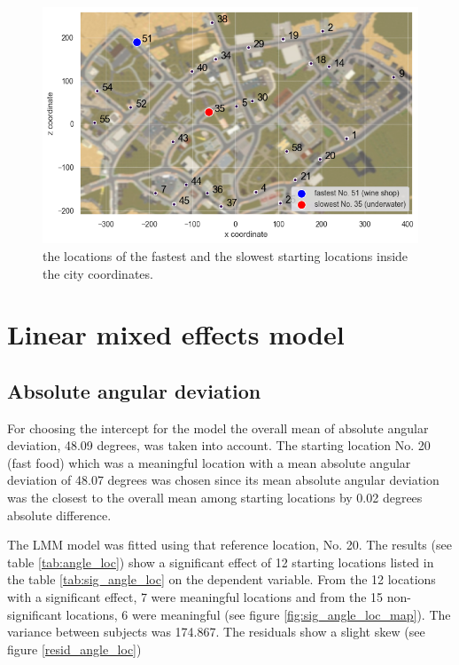 \begin{figure}[!htb]
	\centering
	\includegraphics[width=140mm]{figures/fastest_slowest_starting_locations_RT_map.png}
	\caption[Locations of fastest and slowest starting locations in city]{the locations of the fastest and the slowest starting locations inside the city coordinates.}
	\label{fig:fastest_slowest_locs}
\end{figure}

\section{Linear mixed effects model}

\subsection{Absolute angular deviation}

For choosing the intercept for the model the overall mean of absolute angular deviation, 48.09 degrees, was taken into account. The starting location No. 20 (fast food) which was a meaningful location with a mean absolute angular deviation of 48.07 degrees was chosen since its mean absolute angular deviation was the closest to the overall mean among starting locations by 0.02 degrees absolute difference.

The LMM model was fitted using that reference location, No. 20. The results (see table \ref{tab:angle_loc}) show a significant effect of 12 starting locations listed in the table \ref{tab:sig_angle_loc} on the dependent variable. From the 12 locations with a significant effect, 7 were meaningful locations and from the 15 non-significant locations, 6 were meaningful (see figure \ref{fig:sig_angle_loc_map}). The variance between subjects was 174.867. The residuals show a slight skew (see figure \ref{resid_angle_loc})

